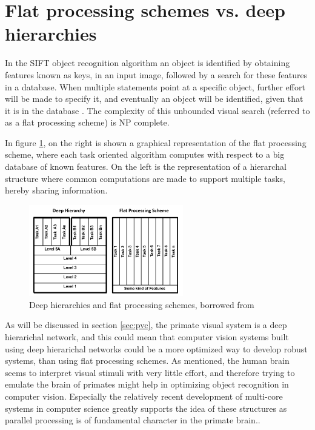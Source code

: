 \section{Flat processing schemes vs. deep hierarchies}
\label{sec:deep_hierarchies}
In the SIFT object recognition algorithm an object is identified
by obtaining features known as keys, in an input image,
followed by a search for these features in a database.
When multiple statements point at a specific object,
further effort will be made to specify it, and eventually an object will be identified,
given that it is in the database \citep{sift}.
The complexity of this unbounded visual search (referred to as a flat processing scheme)
is NP complete\citep{fidler2009learning}.

In figure \ref{fig:deepvsflat}, on the right is shown a graphical representation of the flat processing scheme,
where each task oriented algorithm computes with respect to a big database of known features.
On the left is the representation of a hierarchal structure where common computations are made to support multiple tasks,
hereby sharing information.

\begin{figure}[h!] %
\centering
\includegraphics[width=0.6\textwidth]{graphics/deepvsflat}
\caption[Deep hierarchies and flat processing schemes]{Deep hierarchies and flat processing schemes, borrowed from}%
\label{fig:deepvsflat}
\end{figure}

As will be discussed in section \ref{sec:pvc}, the primate visual system
is a deep hierarichal network, and this could mean that
computer vision systems built using deep hierarichal networks could
be a more optimized way to develop robust systems, than using flat processing schemes.
As mentioned, the human brain seems to interpret visual stimuli with very little effort,
and therefore trying to emulate the brain of primates might help in optimizing object recognition in computer vision.
Especially the relatively recent development of multi-core systems in computer science
greatly supports the idea of these structures as parallel processing is of fundamental character in the primate brain.\citep{fidler2009learning}.

